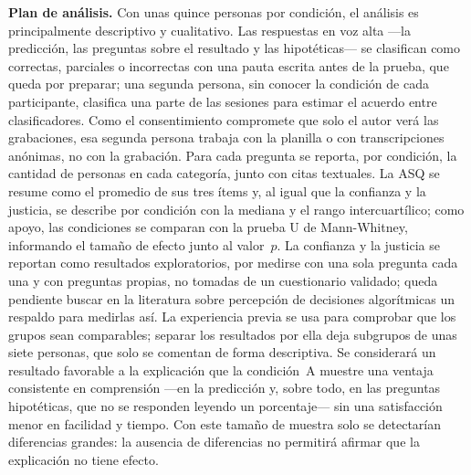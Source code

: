 \textbf{Plan de análisis.} Con unas quince personas por condición, el análisis es principalmente descriptivo y cualitativo. Las respuestas en voz alta ---la predicción, las preguntas sobre el resultado y las hipotéticas--- se clasifican como correctas, parciales o incorrectas con una pauta escrita antes de la prueba, que queda por preparar; una segunda persona, sin conocer la condición de cada participante, clasifica una parte de las sesiones para estimar el acuerdo entre clasificadores. Como el consentimiento compromete que solo el autor verá las grabaciones, esa segunda persona trabaja con la planilla o con transcripciones anónimas, no con la grabación. Para cada pregunta se reporta, por condición, la cantidad de personas en cada categoría, junto con citas textuales. La ASQ se resume como el promedio de sus tres ítems y, al igual que la confianza y la justicia, se describe por condición con la mediana y el rango intercuartílico; como apoyo, las condiciones se comparan con la prueba U de Mann-Whitney, informando el tamaño de efecto junto al valor~$p$. La confianza y la justicia se reportan como resultados exploratorios, por medirse con una sola pregunta cada una y con preguntas propias, no tomadas de un cuestionario validado; queda pendiente buscar en la literatura sobre percepción de decisiones algorítmicas un respaldo para medirlas así. La experiencia previa se usa para comprobar que los grupos sean comparables; separar los resultados por ella deja subgrupos de unas siete personas, que solo se comentan de forma descriptiva. Se considerará un resultado favorable a la explicación que la condición~A muestre una ventaja consistente en comprensión ---en la predicción y, sobre todo, en las preguntas hipotéticas, que no se responden leyendo un porcentaje--- sin una satisfacción menor en facilidad y tiempo. Con este tamaño de muestra solo se detectarían diferencias grandes: la ausencia de diferencias no permitirá afirmar que la explicación no tiene efecto.

